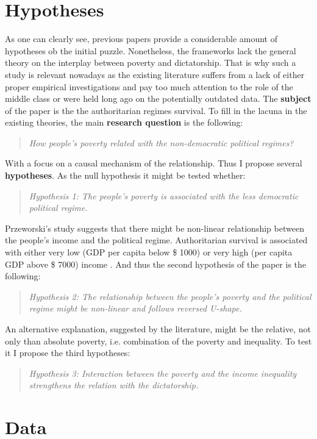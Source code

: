 \documentclass[a4paper, 12pt]{article}
\begin{document}
	\section{Hypotheses}
	
	As one can clearly see, previous papers provide a considerable amount of hypotheses ob the initial puzzle. Nonetheless, the frameworks lack the general theory on the interplay between poverty and dictatorship. That is why such a study is relevant nowadays as the existing literature suffers from a lack of either proper empirical investigations and pay too much attention to the role of the middle class or were held long ago on the potentially outdated data. The \textbf{subject} of the paper is the the authoritarian regimes survival. To fill in the lacuna in the existing theories, the main\textbf{ research question} is the following:
    \begin{quote}
    \textit{How people's poverty related with the non-democratic political regimes?}
    \end{quote}
    \noindent With a focus on a causal mechanism of the relationship. Thus I propose several \textbf{hypotheses}. As the null hypothesis it might be tested whether:
    \begin{quote}
        \textit{Hypothesis 1: The people's poverty is associated with the less democratic political regime.}   
    \end{quote}
    Przeworski's study suggests that there might be non-linear relationship between the people's income and the political regime. Authoritarian survival is associated with either very low (GDP per capita below \$ 1000) or very high (per capita GDP above \$ 7000) income \parencite{democracy_development}. And thus the second hypothesis of the paper is the following:
    \begin{quote}
        \textit{Hypothesis 2: The relationship between the people's poverty and the political regime might be non-linear and follows reversed U-shape.}    
    \end{quote}
    An alternative explanation, suggested by the literature, might be the relative, not only than absolute poverty, i.e. combination of the poverty and inequality. To test it I propose the third hypotheses:
    \begin{quote}
        \textit{Hypothesis 3: Interaction between the poverty and the income inequality strengthens the relation with the dictatorship.}
    \end{quote}
    
    \section{Data}
    
\end{document}
